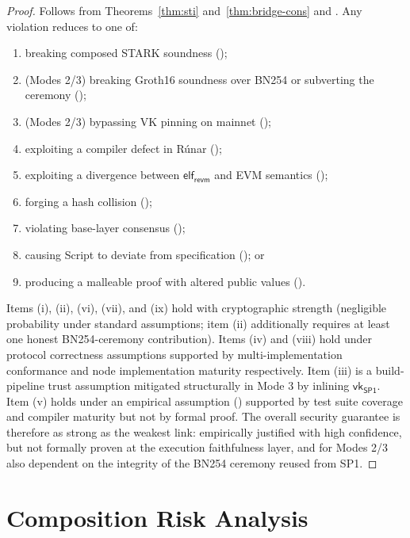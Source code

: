 \documentclass[11pt,a4paper]{article}
\newcommand{\SPone}{\mathsf{SP1}}
\newcommand{\revm}{\textsf{revm}}
\newcommand{\Runar}{\textsf{R\'{u}nar}}
\newcommand{\vkSP}{\mathsf{vk}_{\SPone}}           %
\begin{document}
\begin{proof}
Follows from Theorems~\ref{thm:sti} and~\ref{thm:bridge-cons} and . Any violation reduces to one of:
\begin{enumerate}[nosep,label=(\roman*)]
    \item breaking composed STARK soundness ();
    \item (Modes 2/3) breaking Groth16 soundness over BN254 or subverting the ceremony ();
    \item (Modes 2/3) bypassing VK pinning on mainnet ();
    \item exploiting a compiler defect in \Runar{} ();
    \item exploiting a divergence between $\mathsf{elf}_{\revm}$ and EVM semantics ();
    \item forging a hash collision ();
    \item violating base-layer consensus ();
    \item causing Script to deviate from specification (); or
    \item producing a malleable proof with altered public values ().
\end{enumerate}
Items (i), (ii), (vi), (vii), and (ix) hold with cryptographic strength (negligible probability under standard assumptions; item (ii) additionally requires at least one honest BN254-ceremony contribution). Items (iv) and (viii) hold under protocol correctness assumptions supported by multi-implementation conformance and node implementation maturity respectively. Item (iii) is a build-pipeline trust assumption mitigated structurally in Mode 3 by inlining $\vkSP$. Item (v) holds under an empirical assumption () supported by test suite coverage and compiler maturity but not by formal proof. The overall security guarantee is therefore as strong as the weakest link: empirically justified with high confidence, but not formally proven at the execution faithfulness layer, and for Modes 2/3 also dependent on the integrity of the BN254 ceremony reused from SP1. \qedhere
\end{proof}


\section{Composition Risk Analysis}\label{sec:composition-risk}
\end{document}
